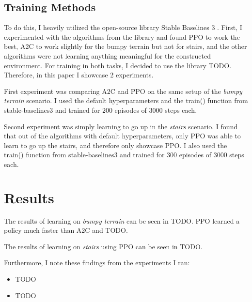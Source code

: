 \documentclass{article}
\begin{document}
\subsection{Training Methods}
To do this, I heavily utilized the open-source library Stable Baselines 3 \cite{stable-baselines3}.
First, I experimented with the algorithms from the library and found PPO \cite{ppo} to work the best, A2C to work slightly for the bumpy terrain but not for stairs, and the other algorithms were not learning anything meaningful for the constructed environment.
For training in both tasks, I decided to use the library TODO.
Therefore, in this paper I showcase 2 experiments.

First experiment was comparing A2C and PPO on the same setup of the \textit{bumpy terrain} scenario.
I used the default hyperparameters and the train() function from stable-baselines3 and trained for 200 episodes of 3000 steps each.

Second experiment was simply learning to go up in the \textit{stairs} scenario. 
I found that out of the algorithms with default hyperparameters, only PPO was able to learn to go up the stairs, and therefore only showcase PPO. 
I also used the train() function from stable-baselines3 and trained for 300 episodes of 3000 steps each.

\section{Results}
The results of learning on \textit{bumpy terrain} can be seen in TODO.
PPO learned a policy much faster than A2C and TODO.

The results of learning on \textit{stairs} using PPO can be seen in TODO.

Furthermore, I note these findings from the experiments I ran:
\begin{itemize}
    \item TODO 
    \item TODO 
\end{itemize}
\end{document}

